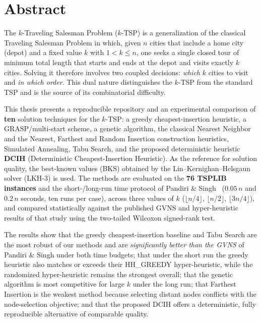 \documentclass[12pt,a4paper,oneside]{report}
\begin{document}
\chapter*{Abstract}

The $k$-Traveling Salesman Problem ($k$-TSP) is a generalization of the classical
Traveling Salesman Problem in which, given $n$ cities that include a home city
(depot) and a fixed value $k$ with $1<k\le n$, one seeks a single closed tour of
minimum total length that starts and ends at the depot and visits exactly $k$
cities. Solving it therefore involves two coupled decisions: \emph{which} $k$
cities to visit and \emph{in which order}. This dual nature distinguishes the
$k$-TSP from the standard TSP and is the source of its combinatorial difficulty.

This thesis presents a reproducible repository and an experimental comparison of
\textbf{ten} solution techniques for the $k$-TSP: a greedy cheapest-insertion
heuristic, a GRASP/multi-start scheme, a genetic algorithm, the classical Nearest
Neighbor and the Nearest, Farthest and Random Insertion construction heuristics,
Simulated Annealing, Tabu Search, and the proposed deterministic heuristic
\textbf{DCIH} (Deterministic Cheapest-Insertion Heuristic). As the reference for
solution quality, the best-known values (BKS) obtained by the
Lin--Kernighan--Helsgaun solver (LKH-3) is used. The methods are evaluated on the
\textbf{76 TSPLIB instances} and the short-/long-run time protocol of Pandiri \&
Singh~\cite{pandiri2020} ($0.05\,n$ and $0.2\,n$ seconds, ten runs per case), across
three values of $k$ ($\lfloor n/4\rfloor$, $\lfloor n/2\rfloor$, $\lfloor 3n/4\rfloor$),
and compared statistically against the published GVNS and hyper-heuristic results
of that study using the two-tailed Wilcoxon signed-rank test.

The results show that the greedy cheapest-insertion baseline and Tabu Search are
the most robust of our methods and are \emph{significantly better than the GVNS} of
Pandiri \& Singh under both time budgets; that under the short run the greedy
heuristic also matches or exceeds their HH\_GREEDY hyper-heuristic, while the
randomized hyper-heuristic remains the strongest overall; that the genetic
algorithm is most competitive for large $k$ under the long run; that Farthest
Insertion is the weakest method because selecting distant nodes conflicts with the
node-selection objective; and that the proposed DCIH offers a deterministic, fully
reproducible alternative of comparable quality.
\end{document}
